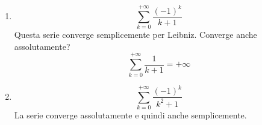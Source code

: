 \begin{exercise}\phantom{}
    \begin{enumerate}
        \item \begin{equation*}\sum^{+\infty}_{k=0}\frac{(-1)^k}{k+1}\end{equation*}
        Questa serie converge semplicemente per Leibniz. Converge anche assolutamente?
        \begin{equation*}
            \sum^{+\infty}_{k=0}\frac{1}{k+1}=+\infty
        \end{equation*}
        
        \item \begin{equation*}\sum^{+\infty}_{k=0}\frac{(-1)^k}{k^2+1}\end{equation*}
        La serie converge assolutamente e quindi anche semplicemente.
    \end{enumerate}        
\end{exercise}


